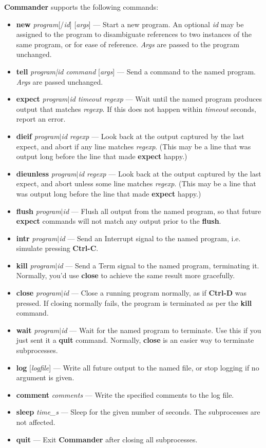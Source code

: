 \documentclass[12pt,oneside]{book}
\def\prog#1{{\bf #1}}
\def\cmd#1{{\bf #1}}
\def\arg#1{{\it #1}}
\def\intr{{\bf Ctrl-C}\xspace}
\def\eoi{{\bf Ctrl-D}\xspace}
\begin{document}
\prog{Commander} supports the following commands:
\begin{itemize}
\item \cmd{new} \arg{program}[/\arg{id}] [\arg{args}] --- Start a new
program. An optional \arg{id} may be assigned to the program to
disambiguate references to two instances of the same program, or for
ease of reference. \arg{Args} are passed to the program unchanged.
\item \cmd{tell} \arg{program|id command} [\arg{args}] --- Send a
command to the named program. \arg{Args} are passed unchanged.
\item \cmd{expect} \arg{program$|$id timeout regexp} --- Wait until
the named program produces output that matches \arg{regexp}. If this
does not happen within \arg{timeout} seconds, report an error.
\item \cmd{dieif} \arg{program$|$id regexp} --- Look back at the
output captured by the last expect, and abort if any line matches
\arg{regexp}. (This may be a line that was output long before the line
that made \cmd{expect} happy.)
\item \cmd{dieunless} \arg{program$|$id regexp} --- Look back at the
output captured by the last expect, and abort unless some line matches
\arg{regexp}. (This may be a line that was output long before the line
that made \cmd{expect} happy.)
\item \cmd{flush} \arg{program$|$id} --- Flush all output from the
named program, so that future \cmd{expect} commands will not match any
output prior to the \cmd{flush}.
\item \cmd{intr} \arg{program$|$id} --- Send an Interrupt signal to
the named program, i.e. simulate pressing \intr.
\item \cmd{kill} \arg{program$|$id} --- Send a Term signal to the
named program, terminating it. Normally, you'd use \cmd{close} to
achieve the same result more gracefully.
\item \cmd{close} \arg{program$|$id} --- Close a running program
normally, as if \eoi was pressed. If closing normally fails, the
program is terminated as per the \cmd{kill} command.
\item \cmd{wait} \arg{program$|$id} --- Wait for the named program to
terminate. Use this if you just sent it a \cmd{quit} command.
Normally, \cmd{close} is an easier way to terminate subprocesses.
\item \cmd{log} [\arg{logfile}] --- Write all future output to the
named file, or stop logging if no argument is given.
\item \cmd{comment} \arg{comments} --- Write the specified comments to
the log file.
\item \cmd{sleep} \arg{time\_s} --- Sleep for the given number of
seconds. The subprocesses are not affected.
\item \cmd{quit} --- Exit \prog{Commander} after closing all subprocesses.
\end{itemize}
\end{document}
